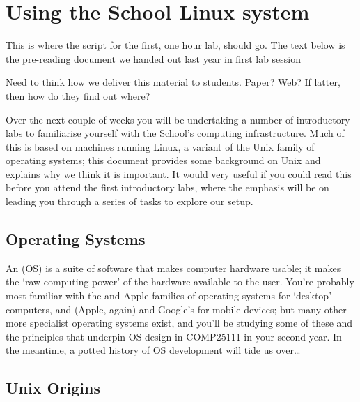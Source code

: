 \chapter{Using the School Linux system}

\begin{note}
  This is where the script for the first, one hour lab, should go. The text below is the pre-reading document we handed out last year in first lab session

  Need to think how we deliver this material to students. Paper? Web?  If latter, then how do they find out where?
\end{note}


Over the next couple of weeks you will be undertaking a number of introductory labs to familiarise yourself with the School's computing infrastructure. Much of this is based on machines running Linux, a variant of the Unix family of operating systems; this document provides some background on Unix and explains why we think it is important. It would very useful if you could read this before you attend the first introductory labs, where the emphasis will be on leading you through a series of tasks to explore our setup.

\section{Operating Systems}

An  (OS) is a suite of software that makes
computer hardware usable; it makes the `raw computing power' of the
hardware available to the user. You're probably most familiar with the  and Apple  families of operating systems for `desktop' computers, and  (Apple, again) and Google's  for mobile devices; but many other more specialist operating systems exist, and you'll be studying some of these and the principles that underpin OS design in COMP25111 in your second year. In the meantime, a potted history of OS development will tide us over\ldots
 
\section{Unix Origins}
\label{sec:unix}


